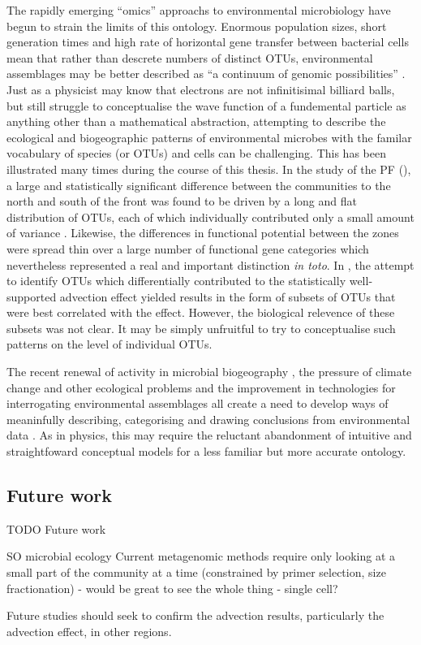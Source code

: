 The rapidly emerging ``omics'' approachs to environmental microbiology have begun to strain the limits of this ontology.
Enormous population sizes, short generation times and high rate of horizontal gene transfer between bacterial cells mean that rather than descrete numbers of distinct \acp{OTU}, environmental assemblages may be better described as ``a continuum of genomic possibilities'' \cite{Goldenfeld:2007im}.
Just as a physicist may know that electrons are not infinitisimal billiard balls, but still struggle to conceptualise the wave function of a fundemental particle as anything other than a mathematical abstraction, attempting to describe the ecological and biogeographic patterns of environmental microbes with the familar vocabulary of species (or \acp{OTU}) and cells can be challenging.
This has been illustrated many times during the course of this thesis.
In the study of the \ac{PF} (), a large and statistically significant difference between the communities to the north and south of the front was found to be driven by a long and flat distribution of \acp{OTU}, each of which individually contributed only a small amount of variance .
Likewise, the differences in functional potential between the zones were spread thin over a large number of functional gene categories  which nevertheless represented a real and important distinction \textit{in toto}.
In , the attempt to identify \acp{OTU} which differentially contributed to the statistically well-supported advection effect yielded results in the form of subsets of \acp{OTU} that were best correlated with the effect.
However, the biological relevence of these subsets was not clear.
It may be simply unfruitful to try to conceptualise such patterns on the level of individual \acp{OTU}.

The recent renewal of activity in microbial biogeography \cite{Ramette:2006jo}, the pressure of climate change and other ecological problems and the improvement in technologies for interrogating environmental assemblages all create a need to develop ways of meaninfully describing, categorising and drawing conclusions from environmental data \cite{Goldenfeld:2007im}.
As in physics, this may require the reluctant abandonment of intuitive and straightfoward conceptual models for a less familiar but more accurate ontology.

\subsection{Future work}
TODO
Future work

SO microbial ecology
Current metagenomic methods require only looking at a small part of the community at a time (constrained by primer selection, size fractionation) - would be great to see the whole thing - single cell?

Future studies should seek to confirm the advection results, particularly the advection effect, in other regions.
